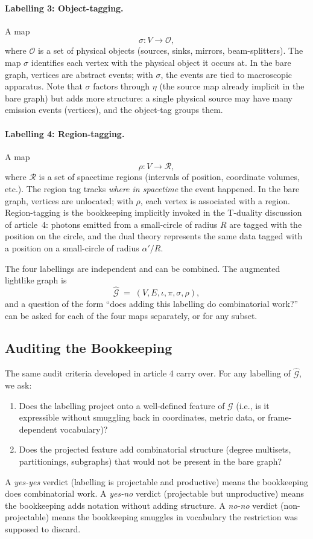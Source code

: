 \documentclass[11pt]{article}
\begin{document}
\paragraph{Labelling 3: Object-tagging.} A map
\[
\sigma : V \to \mathcal{O},
\]
where $\mathcal{O}$ is a set of physical objects (sources, sinks, mirrors, beam-splitters). The map $\sigma$ identifies each vertex with the physical object it occurs at. In the bare graph, vertices are abstract events; with $\sigma$, the events are tied to macroscopic apparatus. Note that $\sigma$ factors through $\eta$ (the source map already implicit in the bare graph) but adds more structure: a single physical source may have many emission events (vertices), and the object-tag groups them.

\paragraph{Labelling 4: Region-tagging.} A map
\[
\rho : V \to \mathcal{R},
\]
where $\mathcal{R}$ is a set of spacetime regions (intervals of position, coordinate volumes, etc.). The region tag tracks \emph{where in spacetime} the event happened. In the bare graph, vertices are unlocated; with $\rho$, each vertex is associated with a region. Region-tagging is the bookkeeping implicitly invoked in the T-duality discussion of article~4: photons emitted from a small-circle of radius $R$ are tagged with the position on the circle, and the dual theory represents the same data tagged with a position on a small-circle of radius $\alpha'/R$.

The four labellings are independent and can be combined. The augmented lightlike graph is
\[
\widehat{\mathcal{G}} \;=\; (V, E, \iota, \pi, \sigma, \rho),
\]
and a question of the form ``does adding this labelling do combinatorial work?'' can be asked for each of the four maps separately, or for any subset.

\subsection{Auditing the Bookkeeping}

The same audit criteria developed in article 4 carry over. For any labelling of $\widehat{\mathcal{G}}$, we ask:
\begin{enumerate}
    \item Does the labelling project onto a well-defined feature of $\mathcal{G}$ (i.e., is it expressible without smuggling back in coordinates, metric data, or frame-dependent vocabulary)?
    \item Does the projected feature add combinatorial structure (degree multisets, partitionings, subgraphs) that would not be present in the bare graph?
\end{enumerate}
A \emph{yes-yes} verdict (labelling is projectable and productive) means the bookkeeping does combinatorial work. A \emph{yes-no} verdict (projectable but unproductive) means the bookkeeping adds notation without adding structure. A \emph{no-no} verdict (non-projectable) means the bookkeeping smuggles in vocabulary the restriction was supposed to discard.
\end{document}
